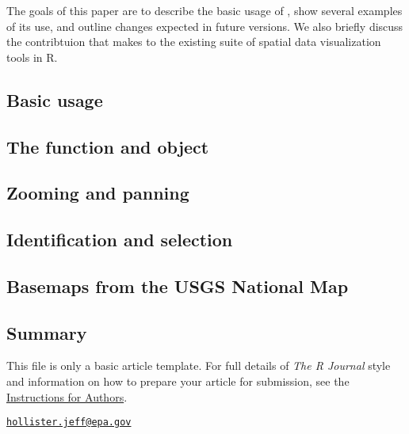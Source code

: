 The goals of this paper are to describe the basic usage of
, show several examples of its use, and outline changes
expected in future versions. We also briefly discuss the contribtuion
that  makes to the existing suite of spatial data
visualization tools in R.

\subsection{Basic usage}\label{basic-usage}

\subsection{The  function and
object}\label{the-function-and-object}

\subsection{Zooming and panning}\label{zooming-and-panning}

\subsection{Identification and
selection}\label{identification-and-selection}

\subsection{Basemaps from the USGS National
Map}\label{basemaps-from-the-usgs-national-map}

\subsection{Summary}\label{summary}

This file is only a basic article template. For full details of
\emph{The R Journal} style and information on how to prepare your
article for submission, see the
\href{https://journal.r-project.org/share/author-guide.pdf}{Instructions
for Authors}.



\address{%
Jeffrey W. Hollister\\
U.S. Environmental Protection Agency\\
Office of Research and Development\\ National Health and Environmental Effects Research Laboratory\\ Atlantic Ecology Division\\ 27 Tarzwell Drive\\ Narragansett, RI 02882\\
}
\href{mailto:hollister.jeff@epa.gov}{\nolinkurl{hollister.jeff@epa.gov}}

